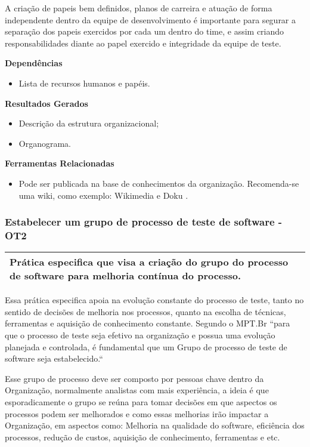 A criação de papeis bem definidos, planos de carreira e atuação de forma independente dentro da equipe de desenvolvimento é importante para segurar a separação dos papeis exercidos por cada um dentro do time, e assim criando responsabilidades diante ao papel exercido e integridade da equipe de teste.

\textbf{Dependências}
\begin{itemize}
    \item Lista de recursos humanos e papéis.
\end{itemize}

\textbf{Resultados Gerados}
\begin{itemize}
    \item Descrição da estrutura organizacional;
    \item Organograma.
\end{itemize}

\textbf{Ferramentas Relacionadas}
\begin{itemize}
    \item Pode ser publicada na base de conhecimentos da organização. Recomenda-se uma wiki, como exemplo: Wikimedia \cite{Wikimedia} e Doku \cite{Doku}.
\end{itemize}

\subsubsection{Estabelecer um grupo de processo de teste de software - OT2}
\label{sec:ot2}

\begin{table}[H]
\centering
\begin{tabular}{|p{130mm}|}
\hline
Prática especifica que visa a criação do grupo do processo de software para melhoria contínua do processo.\\ 
\hline
\end{tabular}
\end{table}

Essa prática especifica apoia na evolução constante do processo de teste, tanto no sentido de decisões de melhoria nos processos, quanto na escolha de técnicas, ferramentas e aquisição de conhecimento constante. Segundo o MPT.Br \cite{GuiaMPTbr} “para que o processo de teste seja efetivo na organização e possua uma evolução planejada e controlada, é fundamental que um Grupo de processo de teste de software seja estabelecido.“

Esse grupo de processo deve ser composto por pessoas chave dentro da Organização, normalmente analistas com mais experiência, a ideia é que esporadicamente o grupo se reúna para tomar decisões em que aspectos os processos podem ser melhorados e como essas melhorias irão impactar a Organização, em aspectos como: Melhoria na qualidade do software, eficiência dos processos, redução de custos, aquisição de conhecimento, ferramentas e etc. 

